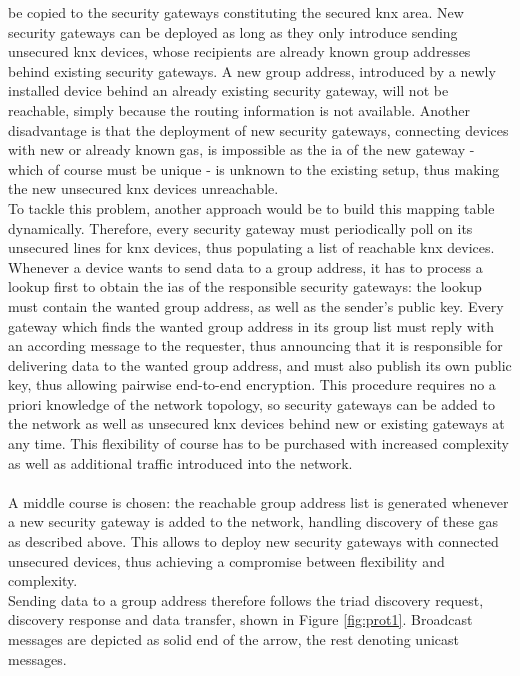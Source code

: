 be copied to the security gateways constituting the secured \gls{knx} area. New security gateways can be deployed as long as they only introduce sending 
unsecured \gls{knx} devices, whose recipients are already known group addresses behind existing security gateways. A new group address, introduced by a newly installed device behind
an already existing security gateway, will not be reachable, simply because the routing information is not available. 
Another disadvantage is that the deployment of new
security gateways, connecting devices with new or already known \glspl{ga}, is impossible as the \gls{ia} of the new gateway - which of
course must be unique - is unknown to the existing setup, thus making the new unsecured \gls{knx} devices unreachable.
\\
To tackle this problem, another approach would be to build this mapping table dynamically. Therefore, every security gateway must periodically poll
on its unsecured lines for \gls{knx} devices, thus populating a list of reachable \gls{knx} devices. Whenever a 
device wants to send data to a group address, it has to process a lookup first to obtain the \glspl{ia} of the responsible security gateways: the lookup
must contain the wanted group address, as well as the sender's public key.
Every 
gateway which finds the wanted group address in its group list must reply with an according message to the requester, thus announcing that it is responsible
for delivering data to the wanted group address, and must also publish its own public key, thus allowing pairwise end-to-end encryption.
This procedure requires no a priori knowledge of
the network topology, so security gateways can be added to the network as well as unsecured \gls{knx} devices behind new or existing gateways at any time. This
flexibility of course has to be purchased with increased complexity as well as additional traffic introduced into the network.
\\
\\
A middle course is chosen: the reachable group address list is generated whenever a new security gateway is added to the network,
 handling discovery of these \glspl{ga} as described
above. This allows to deploy new security gateways with connected unsecured devices, thus achieving a compromise between flexibility and complexity. 
\\
Sending data to a group address therefore follows the triad discovery request, discovery response and data transfer, shown in Figure \ref{fig:prot1}. Broadcast
messages are depicted as solid end of the arrow, the rest denoting unicast messages.
